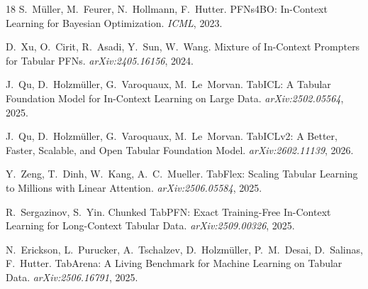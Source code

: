 \documentclass{article}
\begin{document}
\begin{thebibliography}{18}
S.~M\"uller, M.~Feurer, N.~Hollmann, F.~Hutter.
\newblock PFNs4BO: In-Context Learning for Bayesian Optimization.
\newblock \emph{ICML}, 2023.

D.~Xu, O.~Cirit, R.~Asadi, Y.~Sun, W.~Wang.
\newblock Mixture of In-Context Prompters for Tabular PFNs.
\newblock \emph{arXiv:2405.16156}, 2024.

J.~Qu, D.~Holzm\"uller, G.~Varoquaux, M.~Le~Morvan.
\newblock TabICL: A Tabular Foundation Model for In-Context Learning on
Large Data.
\newblock \emph{arXiv:2502.05564}, 2025.

J.~Qu, D.~Holzm\"uller, G.~Varoquaux, M.~Le~Morvan.
\newblock TabICLv2: A Better, Faster, Scalable, and Open Tabular Foundation
Model.
\newblock \emph{arXiv:2602.11139}, 2026.

Y.~Zeng, T.~Dinh, W.~Kang, A.~C.~Mueller.
\newblock TabFlex: Scaling Tabular Learning to Millions with Linear
Attention.
\newblock \emph{arXiv:2506.05584}, 2025.

R.~Sergazinov, S.~Yin.
\newblock Chunked TabPFN: Exact Training-Free In-Context Learning for
Long-Context Tabular Data.
\newblock \emph{arXiv:2509.00326}, 2025.

N.~Erickson, L.~Purucker, A.~Tschalzev, D.~Holzm\"uller, P.~M.~Desai,
D.~Salinas, F.~Hutter.
\newblock TabArena: A Living Benchmark for Machine Learning on Tabular Data.
\newblock \emph{arXiv:2506.16791}, 2025.

\end{thebibliography}
\end{document}
